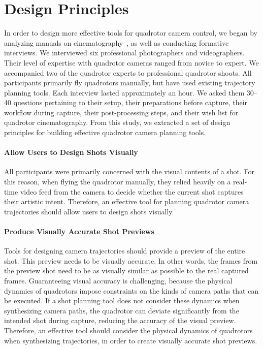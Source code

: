 \section{Design Principles}
\label{sec:ch2:design}

In order to design more effective tools for quadrotor camera control, we began by analyzing manuals on cinematography~\cite{mascelli:1965,arijon:1976,katz:1991}, as well as conducting formative interviews. 
We interviewed six professional photographers and videographers.
Their level of expertise with quadrotor cameras ranged from novice to expert.
We accompanied two of the quadrotor experts to professional quadrotor shoots.
All participants primarily fly quadrotors manually, but have used existing trajectory planning tools.
Each interview lasted approximately an hour.
We asked them 30--40 questions pertaining to their setup, their preparations before capture, their workflow during capture, their post-processing steps, and their wish list for quadrotor cinematography.
From this study, we extracted a set of design principles for building effective quadrotor camera planning tools.   

\paragraph{Allow Users to Design Shots Visually}
All participants were primarily concerned with the visual contents of a shot.
For this reason, when flying the quadrotor manually, they relied heavily on a real-time video feed from the camera to decide whether the current shot captures their artistic intent.
Therefore, an effective tool for planning quadrotor camera trajectories should allow users to design shots visually. 

\paragraph{Produce Visually Accurate Shot Previews}
Tools for designing camera trajectories should provide a preview of the entire shot.
This preview needs to be visually accurate. In other words, the frames from the preview shot need to be as visually similar as possible to the real captured frames.
Guaranteeing visual accuracy is challenging, because the physical dynamics of quadrotors impose constraints on the kinds of camera paths that can be executed.
If a shot planning tool does not consider these dynamics when synthesizing camera paths, the quadrotor can deviate significantly from the intended shot during capture, reducing the accuracy of the visual preview.
Therefore, an effective tool should consider the physical dynamics of quadrotors when synthesizing trajectories, in order to create visually accurate shot previews. 

